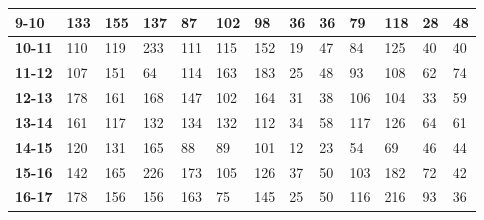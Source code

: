 \begin{table}[H]
\begin{tabular}{|l|l|l|l|l|l|l|l|l|l|l|l|l|}
\textbf{9-10}           & 133                    & 155                    & 137                    & 87                     & 102                    & 98                     & 36                    & 36                    & 79                     & 118                    & 28                    & 48                    \\ \hline
\textbf{10-11}          & 110                    & 119                    & 233                    & 111                    & 115                    & 152                    & 19                    & 47                    & 84                     & 125                    & 40                    & 40                    \\ \hline
\textbf{11-12}          & 107                    & 151                    & 64                     & 114                    & 163                    & 183                    & 25                    & 48                    & 93                     & 108                    & 62                    & 74                    \\ \hline
\textbf{12-13}          & 178                    & 161                    & 168                    & 147                    & 102                    & 164                    & 31                    & 38                    & 106                    & 104                    & 33                    & 59                    \\ \hline
\textbf{13-14}          & 161                    & 117                    & 132                    & 134                    & 132                    & 112                    & 34                    & 58                    & 117                    & 126                    & 64                    & 61                    \\ \hline
\textbf{14-15}          & 120                    & 131                    & 165                    & 88                     & 89                     & 101                    & 12                    & 23                    & 54                     & 69                     & 46                    & 44                    \\ \hline
\textbf{15-16}          & 142                    & 165                    & 226                    & 173                    & 105                    & 126                    & 37                    & 50                    & 103                    & 182                    & 72                    & 42                    \\ \hline
\textbf{16-17}          & 178                    & 156                    & 156                    & 163                    & 75                     & 145                    & 25                    & 50                    & 116                    & 216                    & 93                    & 36                    \\ \hline

\end{tabular}
\end{table}
